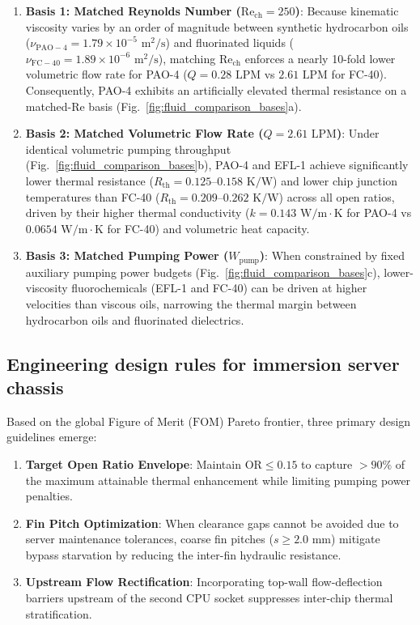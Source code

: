 \begin{enumerate}
\item \textbf{Basis 1: Matched Reynolds Number ($\mathrm{Re}_{\mathrm{ch}} = 250$)}: Because kinematic viscosity varies by an order of magnitude between synthetic hydrocarbon oils ($\nu_{\mathrm{PAO-4}} = 1.79 \times 10^{-5}\text{ m}^2\text{/s}$) and fluorinated liquids ($\nu_{\mathrm{FC-40}} = 1.89 \times 10^{-6}\text{ m}^2\text{/s}$), matching $\mathrm{Re}_{\mathrm{ch}}$ enforces a nearly 10-fold lower volumetric flow rate for PAO-4 ($Q = 0.28\text{ LPM}$ vs $2.61\text{ LPM}$ for FC-40). Consequently, PAO-4 exhibits an artificially elevated thermal resistance on a matched-Re basis (Fig.~\ref{fig:fluid_comparison_bases}a).
\item \textbf{Basis 2: Matched Volumetric Flow Rate ($Q = 2.61\text{ LPM}$)}: Under identical volumetric pumping throughput (Fig.~\ref{fig:fluid_comparison_bases}b), PAO-4 and EFL-1 achieve significantly lower thermal resistance ($R_{\mathrm{th}} = 0.125\text{--}0.158\text{ K/W}$) and lower chip junction temperatures than FC-40 ($R_{\mathrm{th}} = 0.209\text{--}0.262\text{ K/W}$) across all open ratios, driven by their higher thermal conductivity ($k = 0.143\text{ W/m}\cdot\text{K}$ for PAO-4 vs $0.0654\text{ W/m}\cdot\text{K}$ for FC-40) and volumetric heat capacity.
\item \textbf{Basis 3: Matched Pumping Power ($W_{\mathrm{pump}}$)}: When constrained by fixed auxiliary pumping power budgets (Fig.~\ref{fig:fluid_comparison_bases}c), lower-viscosity fluorochemicals (EFL-1 and FC-40) can be driven at higher velocities than viscous oils, narrowing the thermal margin between hydrocarbon oils and fluorinated dielectrics.
\end{enumerate}

\subsection{Engineering design rules for immersion server chassis}
\label{sec:disc_design_rules}

Based on the global Figure of Merit ($\mathrm{FOM}$) Pareto frontier, three primary design guidelines emerge:
\begin{enumerate}
\item \textbf{Target Open Ratio Envelope}: Maintain $\mathrm{OR} \le 0.15$ to capture $>90\%$ of the maximum attainable thermal enhancement while limiting pumping power penalties.
\item \textbf{Fin Pitch Optimization}: When clearance gaps cannot be avoided due to server maintenance tolerances, coarse fin pitches ($s \ge 2.0\text{ mm}$) mitigate bypass starvation by reducing the inter-fin hydraulic resistance.
\item \textbf{Upstream Flow Rectification}: Incorporating top-wall flow-deflection barriers upstream of the second CPU socket suppresses inter-chip thermal stratification.
\end{enumerate}

